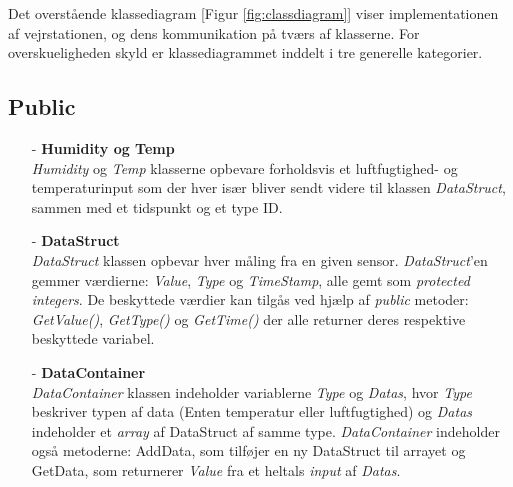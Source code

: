 \noindent
Det overstående klassediagram [Figur \ref{fig:classdiagram}] viser implementationen af vejrstationen, og dens kommunikation på tværs af klasserne. For overskueligheden skyld er klassediagrammet inddelt i tre generelle kategorier.

\subsection{Public}
\begin{itemize}
    \item[-] \textbf{Humidity og Temp} \hfill \\
    \textit{Humidity} og \textit{Temp} klasserne opbevare forholdsvis et luftfugtighed- og temperaturinput som der hver især bliver sendt videre til klassen \textit{DataStruct}, sammen med et tidspunkt og et type ID. 
    
    \item[-] \textbf{DataStruct} \hfill \\
    \textit{DataStruct} klassen opbevar hver måling fra en given sensor. \textit{DataStruct}'en gemmer værdierne: \textit{Value}, \textit{Type} og \textit{TimeStamp}, alle gemt som \textit{protected integers}. De beskyttede værdier kan tilgås ved hjælp af \textit{public} metoder: \textit{GetValue()}, \textit{GetType()} og \textit{GetTime()} der alle returner deres respektive beskyttede variabel.
    
    \item[-] \textbf{DataContainer} \hfill \\
    \textit{DataContainer} klassen indeholder variablerne \textit{Type} og \textit{Datas}, hvor \textit{Type} beskriver typen af data (Enten temperatur eller luftfugtighed) og \textit{Datas} indeholder et \textit{array} af DataStruct af samme type.  \textit{DataContainer} indeholder også metoderne: AddData, som tilføjer en ny DataStruct til arrayet og GetData, som returnerer \textit{Value} fra et heltals \textit{input} af \textit{Datas}.
\end{itemize}

